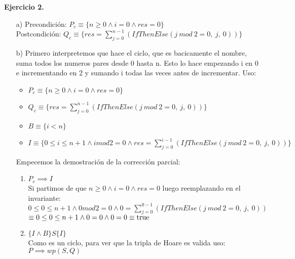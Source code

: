 \documentclass{article}
\begin{document}
\newpage
\textbf{Ejercicio 2.} 
\begin{itemize}
    \item [a)] Precondici\'on: $P_c \equiv \{n \geq 0 \land i = 0 \land res = 0\}$\\
    Postcondici\'on: $Q_c \equiv \{res = \sum_{j=0}^{n-1} (IfThenElse(j\ mod\ 2 = 0,\ j,\ 0))\}$
    \item [b)] Primero interpretemos que hace el ciclo, que es bacicamente el nombre, suma todos los numeros pares desde 0 hasta n. Esto lo hace empezando i en 0 e incrementando en 2 y sumando i todas las veces antes de incrementar.
    Uso:
    \begin{itemize}
        \item $P_c \equiv \{n \geq 0 \land i = 0 \land res = 0\}$
        \item $Q_c \equiv \{res = \sum_{j=0}^{n-1} (IfThenElse(j\ mod\ 2 = 0,\ j,\ 0))\}$
        \item $B \equiv \{i < n\}$
        \item $I \equiv \{0 \leq i \leq n + 1 \land i mod 2 = 0 \land res = \sum_{j=0}^{i-1} (IfThenElse(j\ mod\ 2 = 0,\ j,\ 0))\}$
    \end{itemize}
    Empecemos la demostraci\'on de la correcci\'on parcial:
    \begin{enumerate}
        \item $P_c \implies I$\\
        Si partimos de que $n \geq 0 \land i = 0 \land res = 0$ luego reemplazando en el invariante:\\
        $0 \leq 0 \leq n + 1 \land 0 mod 2 = 0 \land 0 = \sum_{j=0}^{0-1} (IfThenElse(j\ mod\ 2 = 0,\ j,\ 0))$\\
        $\equiv 0 \leq 0 \leq n + 1 \land 0 = 0 \land 0 = 0 \equiv \mathrm{true}$ \checkmark

        \item $\{I \land B\}S\{I\}$\\
        Como es un ciclo, para ver que la tripla de Hoare es valida uso: $P \implies wp(S, Q)$ 
    

\end{enumerate}
\end{itemize}
\end{document}
